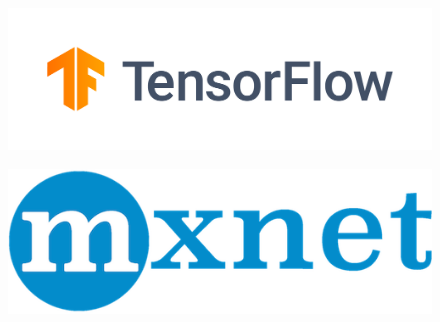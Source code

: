 \documentclass[aspectratio=1610]{beamer}
\begin{document}
\begin{frame}
\begin{columns}
\begin{column}{0.38\textwidth}
\begin{figure}
            \end{figure}
            \begin{figure}
                \centering
                \includegraphics[width=0.8\linewidth]{images/tensorflow.png}
                
            \end{figure}
            \begin{figure}
                \centering
                \includegraphics[width=0.7\linewidth]{images/mxnet.png}
                
            \end{figure}
        \end{column}
    \end{columns}
\end{frame}
\end{document}
